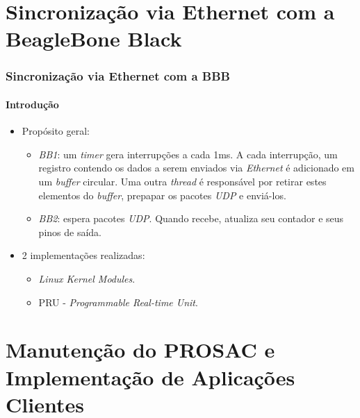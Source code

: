 \documentclass{beamer}
\begin{document}
\section {Sincronização via Ethernet com a BeagleBone Black}

\begin{frame}
\frametitle{Sincronização via Ethernet com a BBB }
\framesubtitle{Introdução}
\begin{itemize}
  \item Propósito geral:
  \begin{itemize}
  \item \textit{BB1}: um \textit{timer} gera
  interrupções a cada 1ms. A cada interrupção, um
  registro contendo os dados a serem enviados via \textit{Ethernet} é
  adicionado em um \textit{buffer} circular. Uma outra \textit{thread}
  é responsável por retirar estes elementos do \textit{buffer}, prepapar os
  pacotes \textit{UDP} e enviá-los.

  \item \textit{BB2}: espera pacotes \textit{UDP}. Quando recebe, atualiza seu
  contador e seus pinos de saída.
  \end{itemize}
  \item 2 implementações realizadas: 
  \begin{itemize}
    \item \textit{Linux Kernel Modules}.
    \item PRU - \textit{Programmable Real-time Unit}.
  \end{itemize}
\end{itemize}
\end{frame}

\section {Manutenção do PROSAC e Implementação de Aplicações Clientes}
\end{document}

